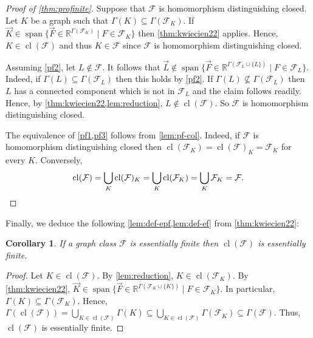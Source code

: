 \documentclass[3p,final]{elsarticle}
\DeclareMathOperator{\spn}{span}
\DeclareMathOperator{\cl}{cl}
\newtheorem{corollary}[theorem]{Corollary}
\begin{document}
	\begin{proof}[Proof of \cref{thm:profinite}]
		Suppose that $\mathcal{F}$ is homomorphism distinguishing closed.
		Let $K$ be a graph such that $\Gamma(K) \subseteq \Gamma(\mathcal{F}_K)$.
		If $\vec{K} \in \spn \{\vec{F} \in \mathbb{R}^{\Gamma(\mathcal{F}_{K})} \mid F \in \mathcal{F}_{K}\}$
		then \cref{thm:kwiecien22} applies. Hence, $K \in \cl(\mathcal{F})$ and thus $K \in \mathcal{F}$ since $\mathcal{F}$ is homomorphism distinguishing closed.
		
		Assuming \cref{pf2}, let $L \not\in \mathcal{F}$.
		It follows that $\vec{L} \not\in \spn\{\vec{F} \in \mathbb{R}^{\Gamma(\mathcal{F}_L \cup \{L\}) } \mid F \in \mathcal{F}_L\}$.
		Indeed, if $\Gamma(L) \subseteq \Gamma(\mathcal{F}_L)$ then this holds by \cref{pf2}. If $\Gamma(L) \not\subseteq \Gamma(\mathcal{F}_L)$ then $L$ has a connected component which is not in $\mathcal{F}_L$ and the claim follows readily.
		Hence, by \cref{thm:kwiecien22,lem:reduction}, $L \not\in \cl(\mathcal{F})$. So $\mathcal{F}$ is homomorphism distinguishing closed.
		
		The equivalence of \cref{pf1,pf3} follows from \cref{lem:pf-col}. Indeed, if $\mathcal{F}$ is homomorphism distinguishing closed then
		$\cl(\mathcal{F}_K) = \cl(\mathcal{F})_K = \mathcal{F}_K$ for every $K$.
		Conversely,
		\[
		\cl(\mathcal{F}) = \bigcup_{K} \cl(\mathcal{F})_K = \bigcup_{K} \cl(\mathcal{F}_K) = \bigcup_K \mathcal{F}_K = \mathcal{F}. \qedhere
		\]
	\end{proof}
	
	Finally, we deduce the following \cref{lem:def-epf,lem:def-ef} from \cref{thm:kwiecien22}:
	
	
	\begin{corollary} \label{lem:def-ef}
		If a graph class $\mathcal{F}$ is essentially finite then $\cl(\mathcal{F})$ is essentially finite.
	\end{corollary}
	\begin{proof}
				Let $K \in \cl(\mathcal{F})$. By \cref{lem:reduction}, $K \in \cl(\mathcal{F}_K)$. 
		By \cref{thm:kwiecien22}, $\vec{K} \in \spn \{\vec{F} \in \mathbb{R}^{\Gamma(\mathcal{F}_K \cup \{K\})} \mid F \in \mathcal{F}_K\}$. In particular, $\Gamma(K) \subseteq \Gamma(\mathcal{F}_K)$. Hence, $\Gamma(\cl(\mathcal{F})) = \bigcup_{K \in \cl(\mathcal{F})} \Gamma(K) \subseteq \bigcup_{K \in \cl(\mathcal{F})} \Gamma(\mathcal{F}_K) \subseteq \Gamma(\mathcal{F})$. Thus, $\cl(\mathcal{F})$ is essentially finite.
	\end{proof}
\end{document}
